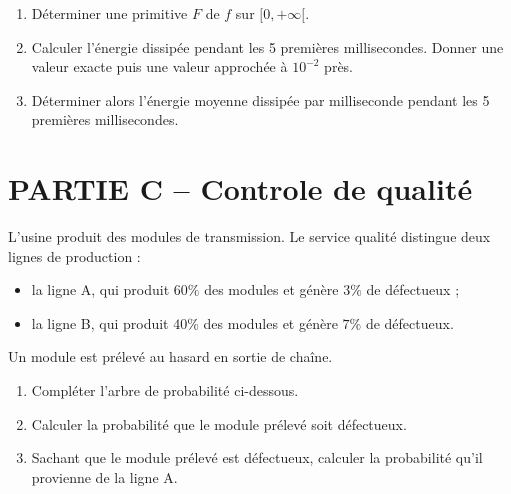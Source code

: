 \begin{enumerate}[series=monDS, resume]
    \item Déterminer une primitive $F$ de $f$ sur $[0,+\infty[$.
    \begin{blocvisiblex}[height=1]
    {\quad}
    \end{blocvisiblex}
    \medskip
    \item Calculer l'énergie dissipée pendant les 5 premières millisecondes. Donner une valeur exacte puis une valeur approchée à $10^{-2}$ près. 
    \begin{blocvisiblex}[height=2]
    {\quad}
    \end{blocvisiblex}
    \medskip
    \item Déterminer alors l'énergie moyenne dissipée par milliseconde pendant les 5 premières millisecondes.
    \begin{blocvisiblex}[height=2]
    {\quad}
    \end{blocvisiblex}
    \medskip
\end{enumerate}
    

\bigskip

\section*{PARTIE C -- Controle de qualité}

L’usine produit des modules de transmission. Le service qualité distingue deux lignes de production :

\begin{itemize}
    \item la ligne A, qui produit $60\%$ des modules et génère $3\%$ de défectueux ;
    \item la ligne B, qui produit $40\%$ des modules et génère $7\%$ de défectueux.
\end{itemize}

Un module est prélevé au hasard en sortie de chaîne.

\begin{enumerate}[series=monDS, resume]
    \item Compléter l'arbre de probabilité ci-dessous.
    \begin{blocvisiblex}[height=2]
    {\quad}
    \end{blocvisiblex}
    \medskip
    \item Calculer la probabilité que le module prélevé soit défectueux.
    \begin{blocvisiblex}[height=2]
    {\quad}
    \end{blocvisiblex}
    \medskip
    \item Sachant que le module prélevé est défectueux, calculer la probabilité qu'il provienne de la ligne A.
    \begin{blocvisiblex}[height=2]
    {\quad}
    \end{blocvisiblex}
\end{enumerate}

